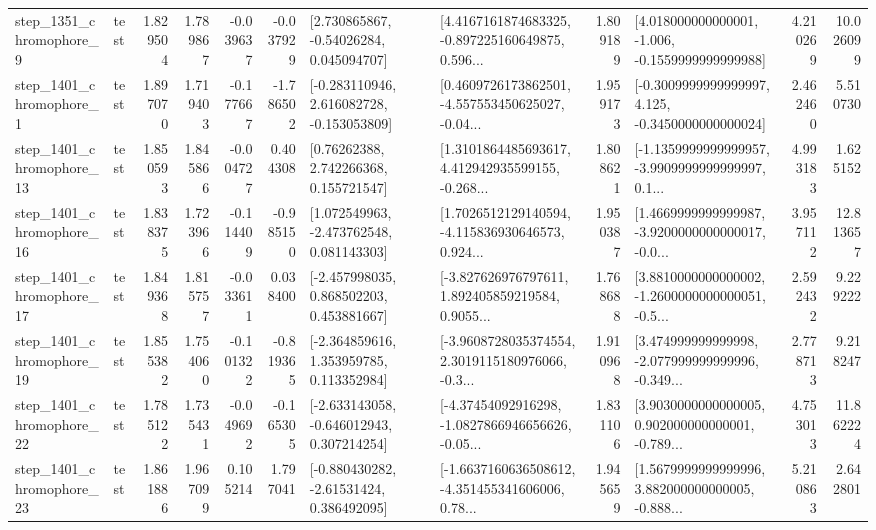 \begin{tabular}{llrrrrllrlrr}
  step\_1351\_chromophore\_9 &      test &      1.829504 &    1.789867 &     -0.039637 & -0.037929 &     [2.730865867, -0.54026284, 0.045094707] &  [4.4167161874683325, -0.897225160649875, 0.596... &       1.809189 &   [4.018000000000001, -1.006, -0.1559999999999988] &            4.210269 &         10.026099 \\
  step\_1401\_chromophore\_1 &      test &      1.897070 &    1.719403 &     -0.177667 & -1.786502 &   [-0.283110946, 2.616082728, -0.153053809] &  [0.4609726173862501, -4.557553450625027, -0.04... &       1.959173 &  [-0.3009999999999997, 4.125, -0.3450000000000024] &            2.462460 &          5.510730 \\
 step\_1401\_chromophore\_13 &      test &      1.850593 &    1.845866 &     -0.004727 &  0.404308 &      [0.76262388, 2.742266368, 0.155721547] &  [1.3101864485693617, 4.412942935599155, -0.268... &       1.808621 &  [-1.1359999999999957, -3.9909999999999997, 0.1... &            4.993183 &          1.625152 \\
 step\_1401\_chromophore\_16 &      test &      1.838375 &    1.723966 &     -0.114409 & -0.985150 &    [1.072549963, -2.473762548, 0.081143303] &  [1.7026512129140594, -4.115836930646573, 0.924... &       1.950387 &  [1.4669999999999987, -3.9200000000000017, -0.0... &            3.957112 &         12.813657 \\
 step\_1401\_chromophore\_17 &      test &      1.849368 &    1.815757 &     -0.033611 &  0.038400 &    [-2.457998035, 0.868502203, 0.453881667] &  [-3.827626976797611, 1.892405859219584, 0.9055... &       1.768688 &  [3.8810000000000002, -1.2600000000000051, -0.5... &            2.592432 &          9.229222 \\
 step\_1401\_chromophore\_19 &      test &      1.855382 &    1.754060 &     -0.101322 & -0.819365 &    [-2.364859616, 1.353959785, 0.113352984] &  [-3.9608728035374554, 2.3019115180976066, -0.3... &       1.910968 &  [3.474999999999998, -2.077999999999996, -0.349... &            2.778713 &          9.218247 \\
 step\_1401\_chromophore\_22 &      test &      1.785122 &    1.735431 &     -0.049692 & -0.165305 &   [-2.633143058, -0.646012943, 0.307214254] &  [-4.37454092916298, -1.0827866946656626, -0.05... &       1.831106 &  [3.9030000000000005, 0.902000000000001, -0.789... &            4.753013 &         11.862224 \\
 step\_1401\_chromophore\_23 &      test &      1.861886 &    1.967099 &      0.105214 &  1.797041 &    [-0.880430282, -2.61531424, 0.386492095] &  [-1.6637160636508612, -4.351455341606006, 0.78... &       1.945659 &  [1.5679999999999996, 3.882000000000005, -0.888... &            5.210863 &          2.642801 \\

\end{tabular}

